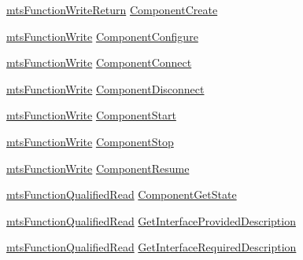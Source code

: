 \begin{DoxyCompactItemize}
\item 
\hyperlink{classmts_function_write_return}{mts\+Function\+Write\+Return} \hyperlink{structmts_manager_component_server_1_1_interface_g_c_m_function_type_abb1e9f78964501f4da69c03de37f4838}{Component\+Create}
\item 
\hyperlink{classmts_function_write}{mts\+Function\+Write} \hyperlink{structmts_manager_component_server_1_1_interface_g_c_m_function_type_a85219d262bbbed632ce7162b09a4d395}{Component\+Configure}
\item 
\hyperlink{classmts_function_write}{mts\+Function\+Write} \hyperlink{structmts_manager_component_server_1_1_interface_g_c_m_function_type_a0195cc5b292cc3678ca36472ea13f17b}{Component\+Connect}
\item 
\hyperlink{classmts_function_write}{mts\+Function\+Write} \hyperlink{structmts_manager_component_server_1_1_interface_g_c_m_function_type_a35e1f1e79cb7512330b5c4bfaf3973ca}{Component\+Disconnect}
\item 
\hyperlink{classmts_function_write}{mts\+Function\+Write} \hyperlink{structmts_manager_component_server_1_1_interface_g_c_m_function_type_a4b94dcd9b220436a6dc09785a03d2f62}{Component\+Start}
\item 
\hyperlink{classmts_function_write}{mts\+Function\+Write} \hyperlink{structmts_manager_component_server_1_1_interface_g_c_m_function_type_acb5efe8ccde82db9df861a278611f775}{Component\+Stop}
\item 
\hyperlink{classmts_function_write}{mts\+Function\+Write} \hyperlink{structmts_manager_component_server_1_1_interface_g_c_m_function_type_a31c3278e2382391cb94e9ee12ad1083b}{Component\+Resume}
\item 
\hyperlink{classmts_function_qualified_read}{mts\+Function\+Qualified\+Read} \hyperlink{structmts_manager_component_server_1_1_interface_g_c_m_function_type_ace36e00d02793bf5cc39208b58a3fc6a}{Component\+Get\+State}
\item 
\hyperlink{classmts_function_qualified_read}{mts\+Function\+Qualified\+Read} \hyperlink{structmts_manager_component_server_1_1_interface_g_c_m_function_type_a8b4a13383c4cbac030962039eed7f91c}{Get\+Interface\+Provided\+Description}
\item 
\hyperlink{classmts_function_qualified_read}{mts\+Function\+Qualified\+Read} \hyperlink{structmts_manager_component_server_1_1_interface_g_c_m_function_type_a0c3fdc2d9ba37daef5c022918fbf4ead}{Get\+Interface\+Required\+Description}
\item 

\end{DoxyCompactItemize}
